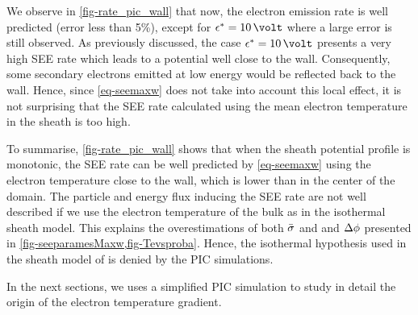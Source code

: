    We observe in \cref{fig-rate_pic_wall} that now, the electron emission rate is well predicted (error less than 5\%), except for $\crover=10\,\volt$ where a large error is still observed.
   As previously discussed, the case $\crover=10\,\volt$ presents a very high SEE rate which leads to a potential well close to the wall.
   Consequently, some secondary electrons emitted at low energy would be reflected back to the wall.
   Hence, since \cref{eq-seemaxw} does not take into account this local effect, it is not surprising that the SEE rate calculated using the mean electron temperature in the sheath is too high.
   
   To summarise, \cref{fig-rate_pic_wall} shows that when the sheath potential profile is monotonic, the \ac{SEE} rate can be well predicted by \cref{eq-seemaxw} using the electron temperature close to the wall, which is lower than in the center of the domain.
   The particle and energy flux inducing the \ac{SEE} rate are not well described if we use the electron temperature of the bulk as in the isothermal sheath model.
   This explains the overestimations of both $ \bar{\sigma }$ and and $\Delta \phi$ presented in \cref{fig-seeparamesMaxw,fig-Tevsproba}.
   Hence, the isothermal hypothesis used in the sheath model of  is denied by the PIC simulations.
   
   In the next sections, we uses a simplified \ac{PIC} simulation to study in detail the origin of the electron temperature gradient.
   

